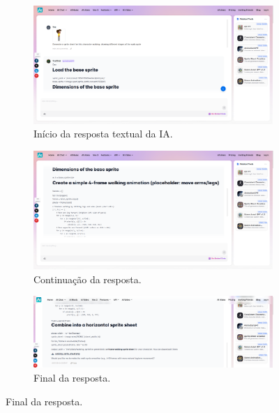 \begin{figure}[htbp]
    \centering
    \caption{\small Processo da utilização mau sucedida do SpriteSheetGPT em agosto/2025}
    \label{fig:yesAI3}

    \begin{subfigure}{1\linewidth}
        \includegraphics[width=1\linewidth]{figs/yesAI/tela5.PNG}
        \caption{\small Início da resposta textual da IA.}
        \label{fig:yesAI3a}
    \end{subfigure}
    \begin{subfigure}{1\linewidth}
        \includegraphics[width=1\linewidth]{figs/yesAI/tela6.PNG}
        \caption{\small Continuação da resposta.}
        \label{fig:yesAI3b}
    \end{subfigure}
    \begin{subfigure}{1\linewidth}
        \includegraphics[width=1\linewidth]{figs/yesAI/tela7.PNG}
        \caption{\small Final da resposta.}
        \label{fig:yesAI3c}
    \end{subfigure}
\end{figure}
